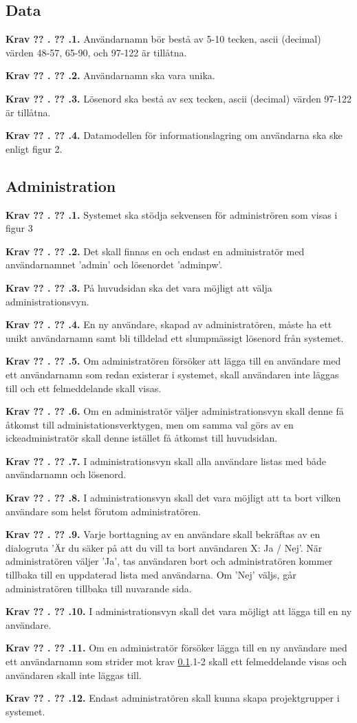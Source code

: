 \documentclass[a4paper]{article}
\newcommand\getcurrentref[1]{%
 \ifnumequal{\value{#1}}{0}
  {??}
  {\the\value{#1}}%
}
\newcommand\requirement[2]{
	\numberedrow{Krav}{#1}{#2}
}
\newcommand\numberedrow[3]{
	\noindent
	\textbf{#1 \getcurrentref{section}.\getcurrentref{subsection}.#2.} #3
	
}
\begin{document}
\subsection{Data}
\label{krav-funk-data}
\requirement{1}{Användarnamn bör bestå av 5-10 tecken, ascii (decimal) värden 48-57, 65-90, och 97-122 är tillåtna.}
\requirement{2}{Användarnamn ska vara unika.}
\requirement{3}{Lösenord ska bestå av sex tecken, ascii (decimal) värden 97-122 är tillåtna.}

\requirement{4}{Datamodellen för informationslagring om användarna ska ske enligt figur 2.
}

\subsection{Administration}
\requirement{1}{Systemet ska stödja sekvensen för administrören som visas i figur 3}
\requirement{2}{Det skall finnas en och endast en administratör med användarnamnet 'admin' och lösenordet 'adminpw'.}
\requirement{3}{På huvudsidan ska det vara möjligt att välja administrationsvyn.}
\requirement{4}{En ny användare, skapad av administratören, måste ha ett unikt användarnamn samt bli tilldelad ett slumpmässigt lösenord från systemet.}
\requirement{5}{Om administratören försöker att lägga till en användare med ett användarnamn som redan existerar i systemet, skall användaren inte läggas till och ett felmeddelande skall visas.}
\requirement{6}{Om en administratör väljer administrationsvyn skall denne få åtkomst till administationsverktygen, men om samma val görs av en ickeadministratör skall denne istället få åtkomst till huvudsidan.}
\requirement{7}{I administrationsvyn skall alla användare listas med både användarnamn och lösenord.}
\requirement{8}{I administrationsvyn skall det vara möjligt att ta bort vilken användare som helst förutom administratören.}
\requirement{9}{Varje borttagning av en användare skall bekräftas av en dialogruta 'Är du säker på att du vill ta bort användaren X: Ja / Nej'. När administratören väljer 'Ja', tas användaren bort och administratören kommer tillbaka till en uppdaterad lista med användarna. Om 'Nej' väljs, går administratören tillbaka till nuvarande sida.}
\requirement{10}{I administrationsvyn skall det vara möjligt att lägga till en ny användare.}
\requirement{11}{Om en administratör försöker lägga till en ny användare med ett användarnamn som strider mot krav \ref{krav-funk-data}.1-2 skall ett felmeddelande visas och användaren skall inte läggas till.}

\requirement{12}{Endast administratören skall kunna skapa projektgrupper i systemet.}
\end{document}

